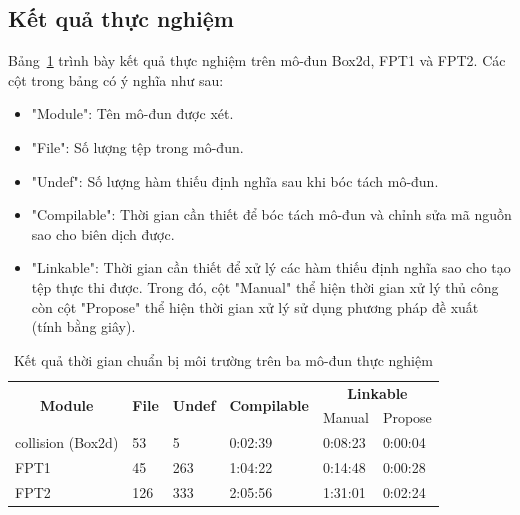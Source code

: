 \subsection{Kết quả thực nghiệm}
Bảng~\ref{tab:time_undef} trình bày kết quả thực nghiệm trên mô-đun Box2d, FPT1 và FPT2. Các cột trong bảng có ý nghĩa như sau:
\begin{itemize}
    \item "Module": Tên mô-đun được xét.
    \item "File": Số lượng tệp trong mô-đun.
    \item "Undef": Số lượng hàm thiếu định nghĩa sau khi bóc tách mô-đun.
    \item "Compilable": Thời gian cần thiết để bóc tách mô-đun và chỉnh sửa mã nguồn sao cho biên dịch được.
    \item "Linkable": Thời gian cần thiết để xử lý các hàm thiếu định nghĩa sao cho tạo tệp thực thi được. Trong đó, cột "Manual" thể hiện thời gian xử lý thủ công còn cột "Propose" thể hiện thời gian xử lý sử dụng phương pháp đề xuất (tính bằng giây).
\end{itemize}

\begin{table}[h]
    \centering
    \caption{Kết quả thời gian chuẩn bị môi trường trên ba mô-đun thực nghiệm}
    \label{tab:time_undef}
\begin{tabular}{|l|l|l|l|ll|}
\hline
\multicolumn{1}{|c|}{\multirow{2}{*}{\textbf{Module}}} & \multicolumn{1}{c|}{\multirow{2}{*}{\textbf{File}}} & \multicolumn{1}{c|}{\multirow{2}{*}{\textbf{Undef}}} & \multirow{2}{*}{\textbf{Compilable}} & \multicolumn{2}{c|}{\textbf{Linkable}} \\ \cline{5-6} 
\multicolumn{1}{|c|}{}                                 & \multicolumn{1}{c|}{}                               & \multicolumn{1}{c|}{}                                &                                      & \multicolumn{1}{l|}{Manual}  & Propose \\ \hline
collision (Box2d)                                      & 53                                                  & 5                                                    & 0:02:39                              & \multicolumn{1}{l|}{0:08:23} & 0:00:04 \\ \hline
FPT1                                     & 45                                                  & 263                                                  & 1:04:22                              & \multicolumn{1}{l|}{0:14:48} & 0:00:28 \\ \hline
FPT2                                          & 126                                                 & 333                                                  & 2:05:56                              & \multicolumn{1}{l|}{1:31:01} & 0:02:24 \\ \hline
\end{tabular}
\end{table}

